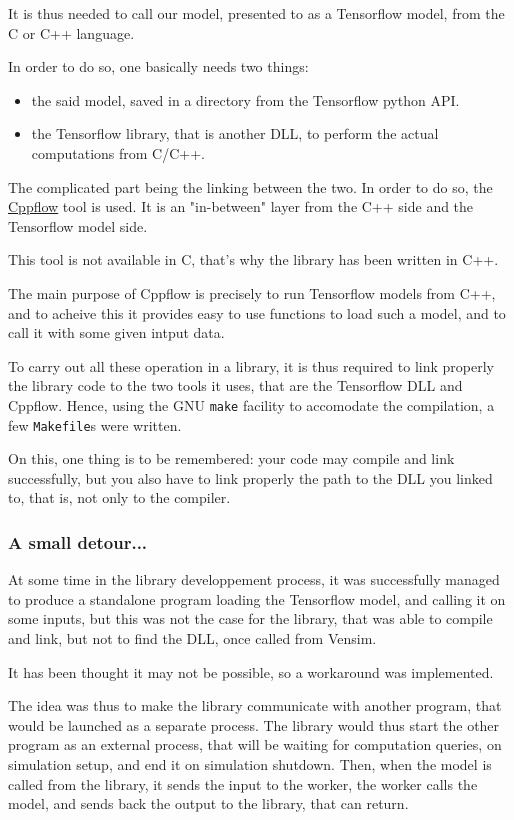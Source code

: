It is thus needed to call our model, presented to as a Tensorflow model, from the C or C++ language.

In order to do so, one basically needs two things:
\begin{itemize}
    \item the said model, saved in a directory from the Tensorflow python API.
    \item the Tensorflow library, that is another DLL, to perform the actual computations from C/C++.
\end{itemize}

The complicated part being the linking between the two. In order to do so, the \href{https://serizba.github.io/cppflow/}{Cppflow} tool is used. It is an "in-between" layer from the C++ side and the Tensorflow model side.

This tool is not available in C, that's why the library has been written in C++.

The main purpose of Cppflow is precisely to run Tensorflow models from C++, and to acheive this it provides easy to use functions to load such a model, and to call it with some given intput data.

To carry out all these operation in a library, it is thus required to link properly the library code to the two tools it uses, that are the Tensorflow DLL and Cppflow. Hence, using the GNU \texttt{make} facility to accomodate the compilation, a few \texttt{Makefile}s were written.

On this, one thing is to be remembered: your code may compile and link successfully, but you also have to link properly the path to the DLL you linked to, that is, not only to the compiler.

\subsubsection{A small detour...}

At some time in the library developpement process, it was successfully managed to produce a standalone program loading the Tensorflow model, and calling it on some inputs, but this was not the case for the library, that was able to compile and link, but not to find the DLL, once called from Vensim.

It has been thought it may not be possible, so a workaround was implemented.

The idea was thus to make the library communicate with another program, that would be launched as a separate process. The library would thus start the other program as an external process, that will be waiting for computation queries, on simulation setup, and end it on simulation shutdown. Then, when the model is called from the library, it sends the input to the worker, the worker calls the model, and sends back the output to the library, that can return.

